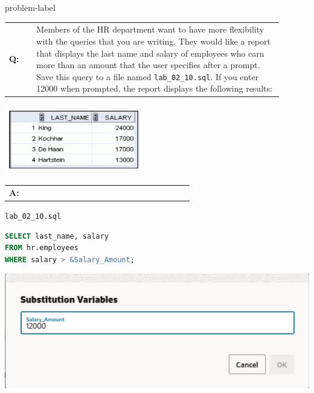 \newpage
\begin{problem}{}{problem-label}

\begin{tabular}{@{}l p{0.9\linewidth}@{}}
  \textbf{Q:} & Members of the HR department want to have more flexibility with the queries that you are writing. They would like a report that displays the last name and salary of employees who earn more than an amount that the user specifies after a prompt. Save this query to a file named \texttt{lab\_02\_10.sql}. If you enter 12000 when prompted, the report displays the following
results:
\end{tabular}

\begin{center}
  \includegraphics[scale=0.8]{images/c2q10.png}
\end{center}

\begin{tabular}{@{}l p{0.9\linewidth}@{}}
  \textbf{A:} & 
\end{tabular}

\hspace{1.5em}\texttt{lab\_02\_10.sql}
\begin{lstlisting}[language=SQL]
SELECT last_name, salary
FROM hr.employees
WHERE salary > &Salary_Amount;
\end{lstlisting}

\vspace{1em}

\begin{center}
  \includegraphics[scale=0.5]{images/c2a10-1.png}
\end{center}


\end{problem}

